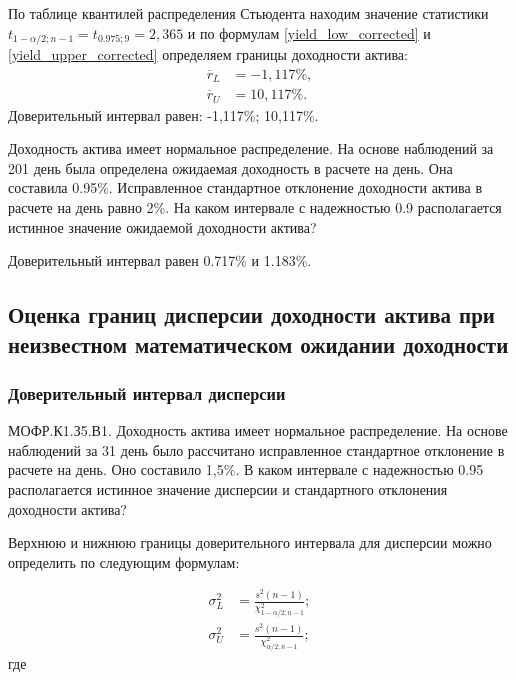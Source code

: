 \documentclass[12pt, table, a4paper,twoside]{exam}
\begin{document}
\begin{questions}
\begin{solution}[6em]
	По  таблице квантилей распределения Стьюдента находим
	значение статистики $t_{1-\alpha/2;n-1}=t_{0.975;9}=2,365$ и по формулам \eqref{yield_low_corrected} и \eqref{yield_upper_corrected} определяем границы доходности актива:
	\begin{align*}
	\overline{r}_L &=-1,117\%,\\
	\overline{r}_U &=10,117\%.
	\end{align*}
	Доверительный интервал равен: -1,117\%; 10,117\%.	
\end{solution}

\question[10] Доходность актива имеет нормальное распределение. На основе наблюдений за 201 день была определена ожидаемая доходность в расчете на день. Она составила 0.95\%. Исправленное стандартное отклонение доходности актива в расчете на день равно 2\%. На каком интервале с надежностью 0.9 располагается истинное значение ожидаемой доходности актива?

\begin{solution}[12em]
	
	\raggedright
	Доверительный интервал равен 0.717\% и 1.183\%.
	
\end{solution}

\vfill\null\pagebreak
\subsection{Оценка границ дисперсии доходности актива при неизвестном математическом ожидании доходности}
\subsubsection{Доверительный интервал дисперсии}
\question[10] МОФР.К1.З5.В1. Доходность актива имеет нормальное распределение. На основе наблюдений за 31 день было рассчитано исправленное стандартное отклонение в расчете на день. Оно составило 1,5\%. В каком интервале с надежностью 0.95 располагается истинное значение дисперсии и стандартного отклонения доходности актива?

\begin{solution}[6em]
\raggedright
Верхнюю и нижнюю границы доверительного интервала для дисперсии можно определить по следующим формулам:

\begin{align}
\sigma_L^2&=\frac{s^2(n-1)}{\chi_{1-\alpha/2;n-1}^2};\\[8pt]
\sigma_U^2&=\frac{s^2(n-1)}{\chi_{\alpha/2;n-1}^2};
\end{align}
где


\end{solution}
\end{questions}
\end{document}
